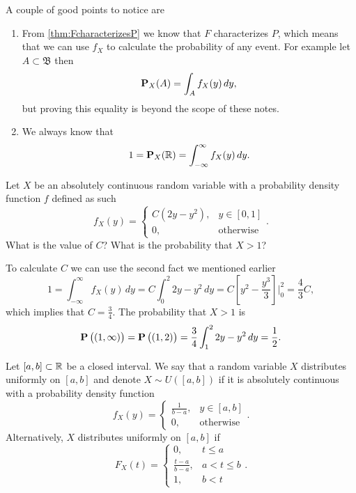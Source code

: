 \documentclass[11pt,a4paper]{article}
\begin{document}
  A couple of good points to notice are
  \begin{enumerate}
    \item From \autoref{thm:FcharacterizesP} we know that $F$ characterizes $P$,
    which means that we can use $f_X$ to calculate the probability of any
    event. For example let $A \subset \mathfrak B$ then
    \[
      \mathbf{P}_X(A) = \int_{A} f_X(y)\,dy,
    \]
    but proving this equality is beyond the scope of these notes.
    \item We always know that
    \[
      1 = \mathbf{P}_X(\mathbb{R}) = \int_{-\infty}^{\infty} f_X(y)\,dy.
    \]
  \end{enumerate}

  \begin{example}
    Let $X$ be an absolutely continuous random variable with a probability
    density function $f$ defined as such
    \[
      f_X(y) =
      \begin{cases}
        C(2y - y^2), &y \in [0,1] \\
        0, &\text{otherwise}
      \end{cases}.
    \]
    What is the value of $C$? What is the probability that $X > 1$?

    To calculate $C$ we can use the second fact we mentioned earlier
    \[
      1 =
      \int_{-\infty}^{\infty} f_X(y)\,dy =
      C \int_{0}^{2} 2y - y^2\,dy =
      C\left[y^2 - \frac{y^3}{3}\right]\biggr\vert_{0}^{2} =
      \frac{4}{3} C,
    \]
    which implies that $C = \frac{3}{4}$. The probability that $X > 1$ is
    \[
      \mathbf{P}\left((1,\infty)\right) =
      \mathbf{P}\left((1,2)\right) =
      \frac{3}{4} \int_{1}^{2} 2y - y^2\,dy =
      \frac{1}{2}.
    \]
  \end{example}

  \begin{definition}
    Let $[a,b] \subset \mathbb{R}$ be a closed interval. We say that a random 
    variable $X$ distributes uniformly on $[a,b]$ and denote $X \sim U([a,b])$
    if it is absolutely continuous with a probability density function
    \[
      f_X(y) =
      \begin{cases}
        \frac{1}{b-a}, &y \in [a,b] \\
        0, &\text{otherwise}
      \end{cases}.
    \]
    Alternatively, $X$ distributes uniformly on $[a,b]$ if
    \[
      F_X(t) =
      \begin{cases}
        0, &t \le a \\
        \frac{t-a}{b-a}, &a < t \le b \\
        1, &b < t
      \end{cases}.
    \]
  \end{definition}
\end{document}
